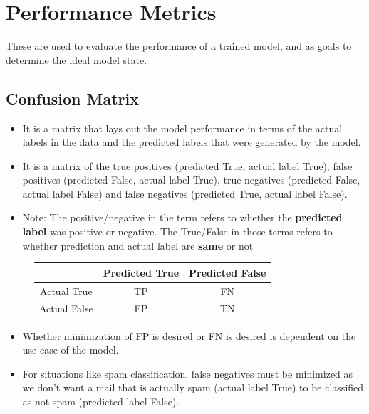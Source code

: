 \documentclass{article}
\theoremstyle{plain}
\theoremstyle{definition}
\begin{document}
\section{Performance Metrics}
These are used to evaluate the performance of a trained model, and as goals to determine the ideal model state. 

\subsection{Confusion Matrix}
\begin{itemize}
    \item It is a matrix that lays out the model performance in terms of the actual labels in the data and the predicted labels that were generated by the model. 
    
    \item It is a matrix of the true positives (predicted True, actual label True), false positives (predicted False, actual label True), true negatives (predicted False, actual label False) and false negatives (predicted True, actual label False).
    
    \item Note: The positive/negative in the term refers to whether the \textbf{predicted label} was positive or negative. The True/False in those terms refers to whether prediction and actual label are \textbf{same} or not
\end{itemize}
\begin{figure}[!h]
\centering
    \begin{tabular}{|c|c|c|}
        \hline
        & Predicted True & Predicted False \\
        \hline
        Actual True & TP & FN \\
        \hline
        Actual False & FP & TN \\
        \hline
    \end{tabular}
\end{figure}

\begin{itemize}
    \item Whether minimization of FP is desired or FN is desired is dependent on the use case of the model. 
    
    \item For situations like spam classification, false negatives must be minimized as we don't want a mail that is actually spam (actual label True) to be classified as not spam (predicted label False). 
\end{itemize}
\end{document}

